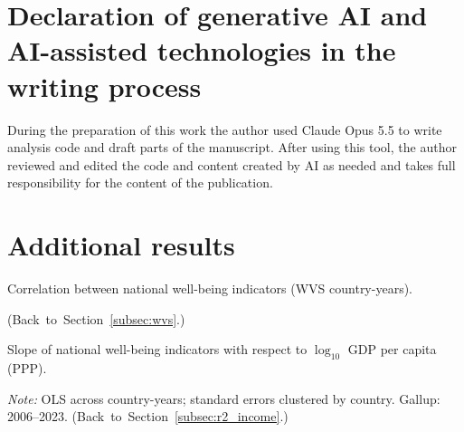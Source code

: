 \documentclass[12pt]{article}
\begin{document}
\section*{Declaration of generative AI and AI-assisted technologies in the writing process}
During the preparation of this work the author used Claude Opus 5.5 to write analysis code and draft parts of the manuscript. After using this tool, the author reviewed and edited the code and content created by AI as needed and takes full responsibility for the content of the publication.



\clearpage
\appendix
\section{Additional results}\label{app:additional}
\renewcommand{\thetable}{A\arabic{table}}
\renewcommand{\thefigure}{A\arabic{figure}}
\setcounter{table}{0}
\setcounter{figure}{0}

\begin{table}[htbp]
    \centering
    \caption{Correlation between national well-being indicators (WVS country-years).}\label{tab:correlation}
    \begin{adjustbox}{max width=\textwidth}
    
    \end{adjustbox}
    \begin{minipage}{\textwidth}\footnotesize \hfill(Back~to~Section~\ref{subsec:wvs}.)\end{minipage}
\end{table}

\begin{table}[htbp]
    \centering
    \caption{Slope of national well-being indicators with respect to $\log_{10}$ GDP per capita (PPP).}\label{tab:slopes}
    \begin{adjustbox}{max width=\textwidth}
    
    \end{adjustbox}
    \begin{minipage}{\textwidth}\footnotesize \textit{Note:} OLS across country-years; standard errors clustered by country. Gallup: 2006--2023. \hfill(Back~to~Section~\ref{subsec:r2_income}.)\end{minipage}
\end{table}
\end{document}
